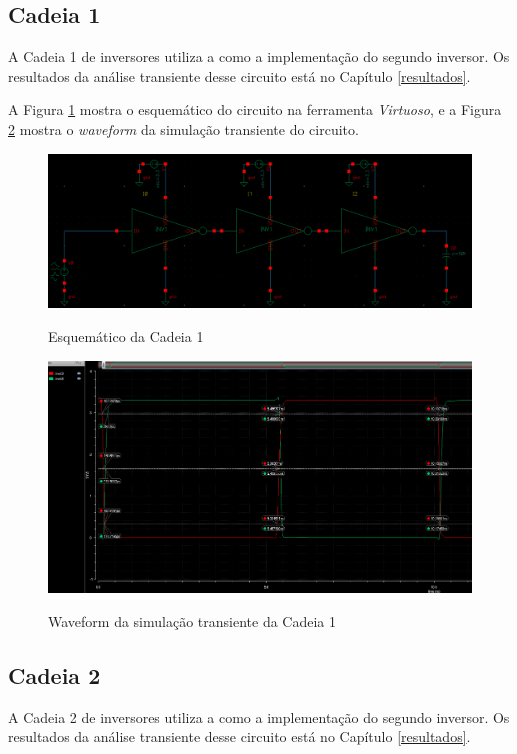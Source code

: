 \documentclass{iiufrgs}
\newcommand{\virtuoso}{\textit{Virtuoso}}
\begin{document}
\subsection{Cadeia 1}
A Cadeia 1 de inversores utiliza a  como a implementação do segundo inversor. Os resultados da análise transiente desse circuito está no Capítulo \ref{resultados}.\

A Figura \ref{fig:circ_e1} mostra o esquemático do circuito na ferramenta \virtuoso, e a Figura \ref{fig:wave1} mostra o \textit{waveform} da simulação transiente do circuito.\

\begin{figure}[htbp]
    \centering
    \caption{Esquemático da Cadeia 1}
    \includegraphics[scale=0.33]{images/circ1.png}
    \label{fig:circ_e1}
\end{figure}

\begin{figure}[htbp]
    \centering
    \caption{Waveform da simulação transiente da Cadeia 1}
    \includegraphics[scale=0.4]{images/wave_ex1.png}
    \label{fig:wave1}
\end{figure}

\FloatBarrier

\subsection{Cadeia 2}
A Cadeia 2 de inversores utiliza a  como a implementação do segundo inversor. Os resultados da análise transiente desse circuito está no Capítulo \ref{resultados}.\
\end{document}

